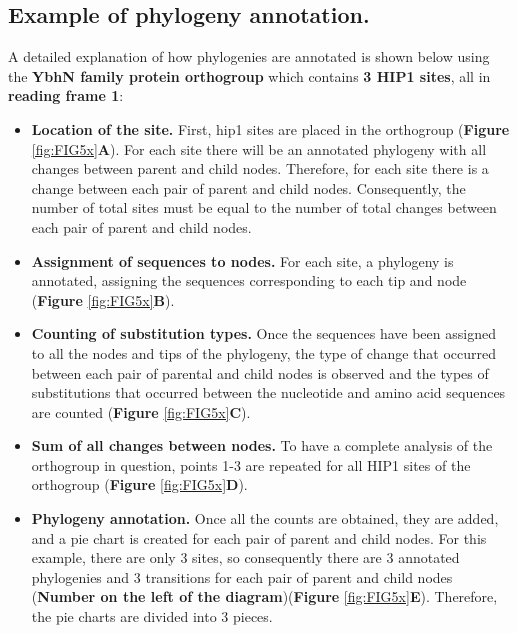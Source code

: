 \documentclass[
]{book}
\begin{document}
\hypertarget{example-of-phylogeny-annotation.}{%
\subsection{Example of phylogeny annotation.}\label{example-of-phylogeny-annotation.}}

A detailed explanation of how phylogenies are annotated is shown below using the \textbf{YbhN family protein orthogroup} which contains \textbf{3 HIP1 sites}, all in \textbf{reading frame 1}:

\begin{itemize}
\item
  \textbf{Location of the site.} First, hip1 sites are placed in the orthogroup (\textbf{Figure} \ref{fig:FIG5x}\textbf{A}). For each site there will be an annotated phylogeny with all changes between parent and child nodes. Therefore, for each site there is a change between each pair of parent and child nodes. Consequently, the number of total sites must be equal to the number of total changes between each pair of parent and child nodes.
\item
  \textbf{Assignment of sequences to nodes.} For each site, a phylogeny is annotated, assigning the sequences corresponding to each tip and node (\textbf{Figure} \ref{fig:FIG5x}\textbf{B}).
\item
  \textbf{Counting of substitution types.} Once the sequences have been assigned to all the nodes and tips of the phylogeny, the type of change that occurred between each pair of parental and child nodes is observed and the types of substitutions that occurred between the nucleotide and amino acid sequences are counted (\textbf{Figure} \ref{fig:FIG5x}\textbf{C}).
\item
  \textbf{Sum of all changes between nodes.} To have a complete analysis of the orthogroup in question, points 1-3 are repeated for all HIP1 sites of the orthogroup (\textbf{Figure} \ref{fig:FIG5x}\textbf{D}).
\item
  \textbf{Phylogeny annotation.} Once all the counts are obtained, they are added, and a pie chart is created for each pair of parent and child nodes. For this example, there are only 3 sites, so consequently there are 3 annotated phylogenies and 3 transitions for each pair of parent and child nodes (\textbf{Number on the left of the diagram})(\textbf{Figure} \ref{fig:FIG5x}\textbf{E}). Therefore, the pie charts are divided into 3 pieces.
\end{itemize}
\end{document}
